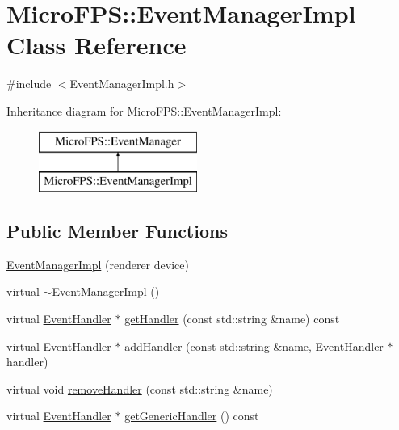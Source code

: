 \hypertarget{class_micro_f_p_s_1_1_event_manager_impl}{
\section{MicroFPS::EventManagerImpl Class Reference}
\label{da/d6e/class_micro_f_p_s_1_1_event_manager_impl}
}


{\ttfamily \#include $<$EventManagerImpl.h$>$}

Inheritance diagram for MicroFPS::EventManagerImpl:\begin{figure}[H]
\begin{center}
\leavevmode
\includegraphics[height=2.000000cm]{da/d6e/class_micro_f_p_s_1_1_event_manager_impl}
\end{center}
\end{figure}
\subsection*{Public Member Functions}
\begin{DoxyCompactItemize}
\item 
\hyperlink{class_micro_f_p_s_1_1_event_manager_impl_ae03322e053908d301144bd5a65cfac91}{EventManagerImpl} (renderer device)
\item 
virtual \hyperlink{class_micro_f_p_s_1_1_event_manager_impl_a9fcaad888fc33cf5134ae2d3d5b3c46d}{$\sim$EventManagerImpl} ()
\item 
virtual \hyperlink{class_micro_f_p_s_1_1_event_handler}{EventHandler} $\ast$ \hyperlink{class_micro_f_p_s_1_1_event_manager_impl_a1a0a7c27fd4d61ce003303b51709b4f1}{getHandler} (const std::string \&name) const 
\item 
virtual \hyperlink{class_micro_f_p_s_1_1_event_handler}{EventHandler} $\ast$ \hyperlink{class_micro_f_p_s_1_1_event_manager_impl_a020c4f3d3ef7f882dd810dcefd3a3163}{addHandler} (const std::string \&name, \hyperlink{class_micro_f_p_s_1_1_event_handler}{EventHandler} $\ast$handler)
\item 
virtual void \hyperlink{class_micro_f_p_s_1_1_event_manager_impl_ad4e79a99503aad699d3ee4047eae7e9b}{removeHandler} (const std::string \&name)
\item 
virtual \hyperlink{class_micro_f_p_s_1_1_event_handler}{EventHandler} $\ast$ \hyperlink{class_micro_f_p_s_1_1_event_manager_impl_aad2ac69757099f6ce69b51bf50da4f26}{getGenericHandler} () const 
\end{DoxyCompactItemize}


